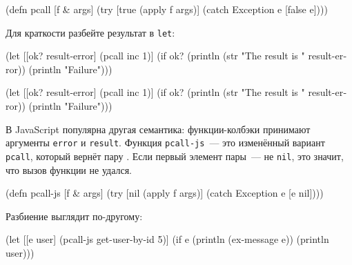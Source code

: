 \begin{english}
  \begin{clojure}
(defn pcall [f & args]
  (try
    [true (apply f args)]
    (catch Exception e [false e])))
  \end{clojure}
\end{english}

Для краткости разбейте результат в \verb|let|:

\ifnarrow

\begin{english}
  \begin{clojure}
(let [[ok? result-error] (pcall inc 1)]
  (if ok?
    (println
      (str "The result is "
        result-error))
    (println "Failure")))
  \end{clojure}
\end{english}

\else

\begin{english}
  \begin{clojure}
(let [[ok? result-error] (pcall inc 1)]
  (if ok?
    (println (str "The result is " result-error))
    (println "Failure")))
  \end{clojure}
\end{english}

\fi


В JavaScript популярна другая семантика: функции-колбэки принимают аргументы
\verb|error| и \verb|result|. Функция \verb|pcall-js|~--- это изменённый вариант
\verb|pcall|, который вернёт пару . Если первый элемент
пары~--- не \verb|nil|, это значит, что вызов функции не удался.

\begin{english}
  \begin{clojure}
(defn pcall-js [f & args]
  (try
    [nil (apply f args)]
    (catch Exception e [e nil])))
  \end{clojure}
\end{english}

\noindent
Разбиение выглядит по-другому:

\ifnarrow

\begin{english}
  \begin{clojure}
(let [[e user]
      (pcall-js get-user-by-id 5)]
  (if e
    (println (ex-message e))
    (println user)))
  \end{clojure}
\end{english}

